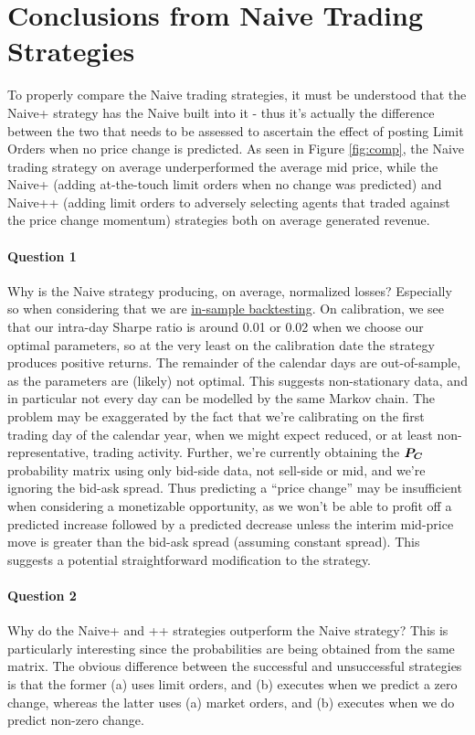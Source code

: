 \section{Conclusions from Naive Trading Strategies}

To properly compare the Naive trading strategies, it must be understood that the Naive+ strategy has the Naive built into it - thus it's actually the difference between the two that needs to be assessed to ascertain the effect of posting Limit Orders when no price change is predicted. As seen in Figure \ref{fig:comp}, the Naive trading strategy on average underperformed the average mid price, while the Naive+ (adding at-the-touch limit orders when no change was predicted) and Naive++ (adding limit orders to adversely selecting agents that traded against the price change momentum) strategies both on average generated revenue. 

\paragraph{Question 1} Why is the Naive strategy producing, on average, normalized losses? Especially so when considering that we are \underline{in-sample backtesting}. On calibration, we see that our intra-day Sharpe ratio is around 0.01 or 0.02 when we choose our optimal parameters, so at the very least on the calibration date the strategy produces positive returns. The remainder of the calendar days are out-of-sample, as the parameters are (likely) not optimal. This suggests non-stationary data, and in particular not every day can be modelled by the same Markov chain. The problem may be exaggerated by the fact that we're calibrating on the first trading day of the calendar year, when we might expect reduced, or at least non-representative, trading activity. Further, we're currently obtaining the $\boldsymbol{P_C}$ probability matrix using only bid-side data, not sell-side or mid, and we're ignoring the bid-ask spread. Thus predicting a ``price change'' may be insufficient when considering a monetizable opportunity, as we won't be able to profit off a predicted increase followed by a predicted decrease unless the interim mid-price move is greater than the bid-ask spread (assuming constant spread). This suggests a potential straightforward modification to the strategy.

\paragraph{Question 2} Why do the Naive+ and ++ strategies outperform the Naive strategy? This is particularly interesting since the probabilities are being obtained from the same matrix. The obvious difference between the successful and unsuccessful strategies is that the former (a) uses limit orders, and (b) executes when we predict a zero change, whereas the latter uses (a) market orders, and (b) executes when we do predict non-zero change.

